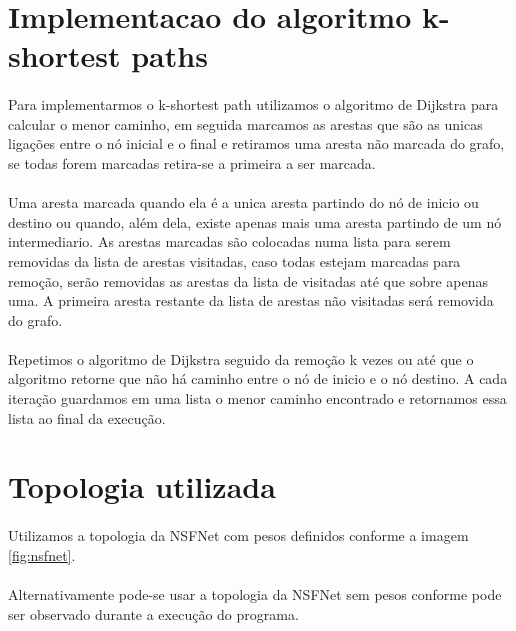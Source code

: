 \documentclass[a4paper,10pt]{article}
\begin{document}
\section{Implementacao do algoritmo k-shortest paths}

  \paragraph{}Para implementarmos o k-shortest path utilizamos o algoritmo de Dijkstra para 
calcular o menor caminho, em seguida marcamos as arestas que são as unicas ligações entre o nó 
inicial e o final e retiramos uma aresta não marcada do grafo, se todas forem marcadas retira-se a 
primeira a ser marcada.
  
  \paragraph{}Uma aresta marcada quando ela é a unica aresta partindo do nó de inicio ou destino ou 
quando, além dela, existe apenas mais uma aresta partindo de um nó intermediario. As arestas 
marcadas são colocadas numa lista para serem removidas da lista de arestas visitadas, caso todas 
estejam marcadas para remoção, serão removidas as arestas da lista de visitadas até que sobre 
apenas uma. A primeira aresta restante da lista de arestas não visitadas será removida do grafo.

  \paragraph{}Repetimos o algoritmo de Dijkstra seguido da remoção k vezes ou até que o algoritmo 
retorne que não há caminho entre o nó de inicio e o nó destino. A cada iteração guardamos em uma 
lista o menor caminho encontrado e retornamos essa lista ao final da execução.

\section{Topologia utilizada}

  \paragraph{}Utilizamos a topologia da NSFNet com pesos definidos conforme a imagem 
\ref{fig:nsfnet}.
  \paragraph{}Alternativamente pode-se usar a topologia da NSFNet sem pesos conforme pode ser 
observado durante a execução do programa.
  
\end{document}
